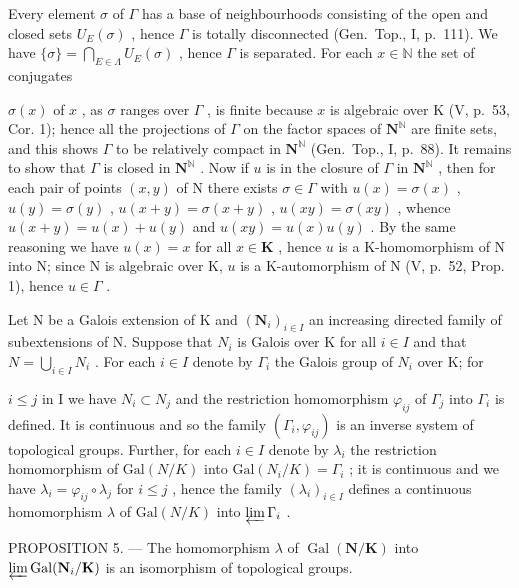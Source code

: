 Every element \(\sigma\) of \(\Gamma\) has a base of neighbourhoods consisting of the open and closed sets \(U_{E}(\sigma)\) , hence \(\Gamma\) is totally disconnected (Gen.~Top., I, p.~111). We have \(\{\sigma\} = \bigcap_{E \in \Lambda} U_{E}(\sigma)\) , hence \(\Gamma\) is separated. For each \(x \in \mathbb{N}\) the set of conjugates

\(\sigma(x)\) of \(x\) , as \(\sigma\) ranges over \(\Gamma\) , is finite because \(x\) is algebraic over K (V, p.~53, Cor. 1); hence all the projections of \(\Gamma\) on the factor spaces of \(\mathbf{N}^{\mathbb{N}}\) are finite sets, and this shows \(\Gamma\) to be relatively compact in \(\mathbf{N}^{\mathbb{N}}\) (Gen.~Top., I, p.~88). It remains to show that \(\Gamma\) is closed in \(\mathbf{N}^{\mathbb{N}}\) . Now if \(u\) is in the closure of \(\Gamma\) in \(\mathbf{N}^{\mathbb{N}}\) , then for each pair of points \((x,y)\) of N there exists \(\sigma \in \Gamma\) with \(u(x) = \sigma(x)\) , \(u(y) = \sigma(y)\) , \(u(x + y) = \sigma(x + y)\) , \(u(xy) = \sigma(xy)\) , whence \(u(x + y) = u(x) + u(y)\) and \(u(xy) = u(x)u(y)\) . By the same reasoning we have \(u(x) = x\) for all \(x \in \mathbf{K}\) , hence \(u\) is a K-homomorphism of N into N; since N is algebraic over K, \(u\) is a K-automorphism of N (V, p.~52, Prop. 1), hence \(u \in \Gamma\) .

Let N be a Galois extension of K and \((\mathbf{N}_{i})_{i\in I}\) an increasing directed family of subextensions of N. Suppose that \(N_{i}\) is Galois over K for all \(i\in I\) and that \(N=\bigcup_{i\in I}N_{i}\) . For each \(i\in I\) denote by \(\Gamma_{i}\) the Galois group of \(N_{i}\) over K; for

\(i \leqslant j\) in I we have \(N_i \subset N_j\) and the restriction homomorphism \(\varphi_{ij}\) of \(\Gamma_j\) into \(\Gamma_i\) is defined. It is continuous and so the family \((\Gamma_i, \varphi_{ij})\) is an inverse system of topological groups. Further, for each \(i \in I\) denote by \(\lambda_i\) the restriction homomorphism of \(\text{Gal}(N/K)\) into \(\text{Gal}(N_i/K) = \Gamma_i\) ; it is continuous and we have \(\lambda_i = \varphi_{ij} \circ \lambda_j\) for \(i \leqslant j\) , hence the family \((\lambda_i)_{i \in I}\) defines a continuous homomorphism \(\lambda\) of \(\text{Gal}(N/K)\) into \(\varprojlim \Gamma_i\) .

PROPOSITION 5. --- The homomorphism \(\lambda\) of \(\operatorname{Gal}(\mathbf{N}/\mathbf{K})\) into \(\varprojlim \operatorname{Gal}(\mathbf{N}_i/\mathbf{K})\) is an isomorphism of topological groups.

